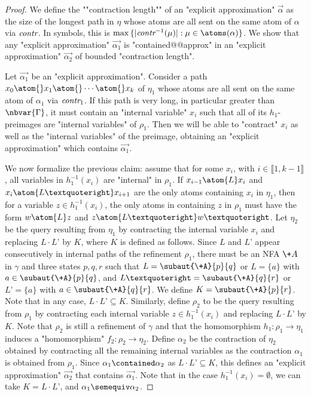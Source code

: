 \begin{proof}
	We define the \AP""contraction length"" of an "explicit approximation" $\vec{\alpha}$
	as the size of the longest path in $\eta$ whose atoms are all sent on the same
	atom of $\alpha$ via $\textit{contr}$. In symbols, this is $\max{\set{|\cont^{-1}(\mu)| : \mu \in \atoms(\alpha)}}$.
	We show that any "explicit approximation" $\vec{\alpha_1}$ is "contained@@approx"
	in an "explicit approximation" $\vec{\alpha_2}$ of bounded "contraction length".

	Let $\vec{\alpha_1}$ be an "explicit approximation".
	Consider a path $x_0 \atom{} x_1 \atom{} \cdots \atom{} x_k$ of $\eta_1$ whose
	atoms are all sent on the same atom of $\alpha_1$ via $\textit{contr}_1$. 
	If this path is very long, in particular greater than $\nbvar{\Gamma}$, it must contain an "internal variable" $x_i$ such that all of its $h_1$-preimages are "internal variables" of $\rho_1$. 
	Then we will be able to "contract" $x_i$ as well as the "internal variables" of the preimage, obtaining an "explicit approximation" which contains $\vec{\alpha_1}$.

	We now formalize the previous claim: assume that for some $x_i$, with $i\in \lBrack 1,k-1\rBrack$, all variables in $h_1^{-1}(x_i)$ are "internal" in $\rho_1$. If $x_{i-1}\atom{L} x_i$ and $x_i\atom{L’} x_{i+1}$ are the only atoms containing $x_i$ in $\eta_1$, then for a variable $z\in h_1^{-1}(x_i)$, the only atoms in  containing $z$ in $\rho_1$ must have the form $w\atom{L} z$ and $z\atom{L’} w’$. Let $\eta_2$ be the query resulting from $\eta_1$ by contracting the internal variable $x_i$ and replacing $L\cdot L’$ by $K$, where $K$ is defined as follows. Since $L$ and $L’$ appear consecutively in internal paths of the refinement $\rho_1$, there must be an  NFA $\+A$ in $\gamma$ and three states $p,q,r$ such that $L=\subaut{\+A}{p}{q}$ or $L=\{a\}$ with $a\in \subaut{\+A}{p}{q}$, and   $L’=\subaut{\+A}{q}{r}$ or $L’=\{a\}$ with $a\in \subaut{\+A}{q}{r}$. We define $K=\subaut{\+A}{p}{r}$. Note that in any case, $L\cdot L’\subseteq K$. Similarly, define $\rho_2$ to be the query resulting from $\rho_1$ by contracting each internal variable $z\in h_1^{-1}(x_i)$ and replacing $L\cdot L’$ by $K$. Note that $\rho_2$ is still a refinement of $\gamma$ and that the homomorphism  $h_1\colon \rho_1 \to \eta_1$ induces a "homomorphism" $f_2\colon \rho_2 \to \eta_2$. Define $\alpha_2$ be the contraction of $\eta_2$ obtained by contracting all the remaining internal variables as  the contraction $\alpha_1$ is obtained from  $\rho_1$. Since $\alpha_1\contained \alpha_2$ as $L\cdot L’\subseteq K$, this defines an  "explicit approximation" $\vec{\alpha_2}$ that contains $\vec{\alpha_1}$. Note that in the case $h_1^{-1}(x_i)=\emptyset$, we can take $K=L\cdot L’$, and $\alpha_1\semequiv \alpha_2$.


\end{proof}
